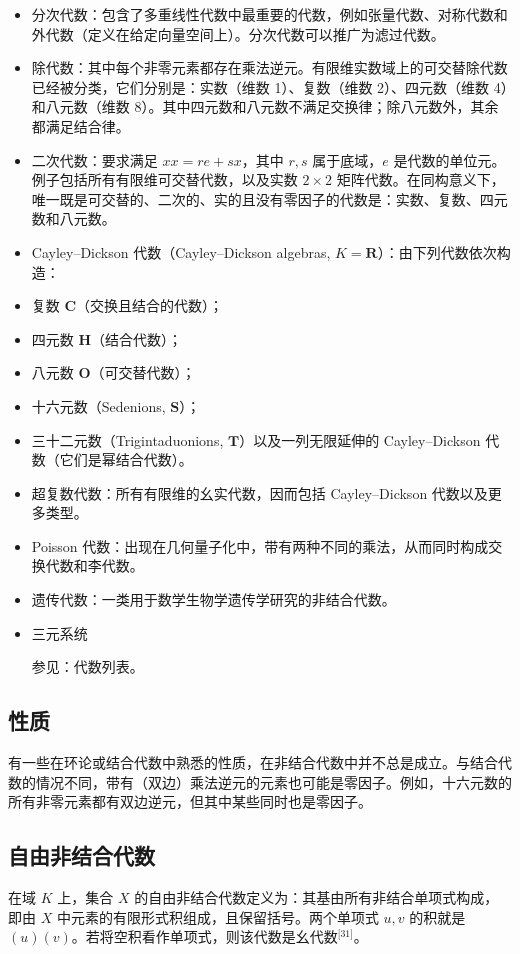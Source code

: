 \begin{itemize}
\item 分次代数：包含了多重线性代数中最重要的代数，例如张量代数、对称代数和外代数（定义在给定向量空间上）。分次代数可以推广为滤过代数。
\item 除代数：其中每个非零元素都存在乘法逆元。有限维实数域上的可交替除代数已经被分类，它们分别是：实数（维数 1）、复数（维数 2）、四元数（维数 4）和八元数（维数 8）。其中四元数和八元数不满足交换律；除八元数外，其余都满足结合律。
\item 二次代数：要求满足 $xx = re + sx$，其中 $r, s$ 属于底域，$e$ 是代数的单位元。例子包括所有有限维可交替代数，以及实数 $2 \times 2$ 矩阵代数。在同构意义下，唯一既是可交替的、二次的、实的且没有零因子的代数是：实数、复数、四元数和八元数。
\item Cayley–Dickson 代数（Cayley–Dickson algebras, $K=\mathbf{R}$）：由下列代数依次构造：
\item 复数 $\mathbf{C}$（交换且结合的代数）；
\item 四元数 $\mathbf{H}$（结合代数）；
\item 八元数 $\mathbf{O}$（可交替代数）；
\item 十六元数（Sedenions, $\mathbf{S}$）；
\item 三十二元数（Trigintaduonions, $\mathbf{T}$）以及一列无限延伸的 Cayley–Dickson 代数（它们是幂结合代数）。
\item 超复数代数：所有有限维的幺实代数，因而包括 Cayley–Dickson 代数以及更多类型。
\item Poisson 代数：出现在几何量子化中，带有两种不同的乘法，从而同时构成交换代数和李代数。
\item 遗传代数：一类用于数学生物学遗传学研究的非结合代数。
\item 三元系统

参见：代数列表。
\end{itemize}
\subsection{性质}
有一些在环论或结合代数中熟悉的性质，在非结合代数中并不总是成立。与结合代数的情况不同，带有（双边）乘法逆元的元素也可能是零因子。例如，十六元数的所有非零元素都有双边逆元，但其中某些同时也是零因子。
\subsection{自由非结合代数}
在域 $K$ 上，集合 $X$ 的自由非结合代数定义为：其基由所有非结合单项式构成，即由 $X$ 中元素的有限形式积组成，且保留括号。两个单项式 $u, v$ 的积就是 $(u)(v)$。若将空积看作单项式，则该代数是幺代数\(^\text{[31]}\)。

